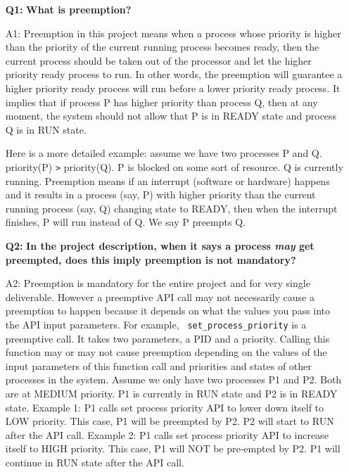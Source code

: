 \begin{itemize}
\item[{\bf Q1:}] {\bf What is preemption?}

\item[A1:] Preemption in this project means when a process whose priority is higher than the priority of the current running process becomes ready, then the current process should be taken out of the processor and let the higher priority ready process to run.
In other words, the preemption will guarantee a higher priority ready process will run before a lower priority ready process. It implies that if process P has higher priority than process Q, then at any moment, the system should not allow that P is in READY state and process Q is in RUN state.

Here is a more detailed example: assume we have two processes P and Q. priority(P) \verb+>+ priority(Q). P is blocked on some sort of resource. Q is currently running.
Preemption means if an interrupt (software or hardware) happens and it results in a process (say, P) with higher priority than the current running process (say, Q) changing state to READY, then when the interrupt finishes, P will run instead of Q. We say P preempts Q.

\item[{\bf Q2:}] {\bf In the project description, when it says a process {\em may} get preempted, does this imply preemption is not mandatory?}

\item[A2:] Preemption is mandatory for the entire project and for very single deliverable. However a preemptive API call may not necessarily cause a preemption to happen because it depends on what the values you pass into the API input parameters. For example, \verb+ set_process_priority+ is a preemptive call. It takes two parameters, a PID and a priority. Calling this function may or may not cause preemption depending on the values of the input parameters of this function call and  priorities and states of other processes in the system.
Assume we only have two processes P1 and P2. Both are at MEDIUM priority. P1 is currently in RUN state and P2 is in READY state.
Example 1: P1 calls set process priority API to lower down itself to LOW priority. This case, P1 will be preempted by P2. P2 will start to RUN after the API call.
Example 2: P1 calls set process priority API to increase itself to HIGH priority. This case, P1 will NOT be pre-empted by P2. P1 will continue in RUN state after the API call.


\end{itemize}
